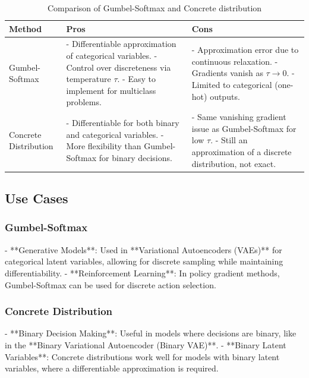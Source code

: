 \documentclass{article}
\begin{document}
\begin{table}[h!]
\centering
\begin{tabularx}{\textwidth}{| m{3cm} | X | X |}
\hline
\textbf{Method} & \textbf{Pros} & \textbf{Cons} \\
\hline
Gumbel-Softmax & - Differentiable approximation of categorical variables. \newline - Control over discreteness via temperature \( \tau \). \newline - Easy to implement for multiclass problems. & - Approximation error due to continuous relaxation. \newline - Gradients vanish as \( \tau \to 0 \). \newline - Limited to categorical (one-hot) outputs. \\
\hline
Concrete Distribution & - Differentiable for both binary and categorical variables. \newline - More flexibility than Gumbel-Softmax for binary decisions. & - Same vanishing gradient issue as Gumbel-Softmax for low \( \tau \). \newline - Still an approximation of a discrete distribution, not exact. \\
\hline
\end{tabularx}
\caption{Comparison of Gumbel-Softmax and Concrete distribution}
\end{table}

\subsection{Use Cases}

\subsubsection{Gumbel-Softmax}
- **Generative Models**: Used in **Variational Autoencoders (VAEs)** for categorical latent variables, allowing for discrete sampling while maintaining differentiability.
- **Reinforcement Learning**: In policy gradient methods, Gumbel-Softmax can be used for discrete action selection.

\subsubsection{Concrete Distribution}
- **Binary Decision Making**: Useful in models where decisions are binary, like in the **Binary Variational Autoencoder (Binary VAE)**.
- **Binary Latent Variables**: Concrete distributions work well for models with binary latent variables, where a differentiable approximation is required.
\end{document}
